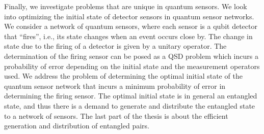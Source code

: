 Finally, we investigate problems that are unique in quantum sensors. We look into optimizing the initial state of detector sensors 
in quantum sensor networks. We consider a network of quantum sensors, where each sensor is a qubit detector that “fires”, 
i.e., its state changes when an event occurs close by. The change in state due to the firing of a detector is given 
by a unitary operator. The determination of the firing sensor can be posed as a QSD problem which incurs a probability 
of error depending on the initial state and the measurement operators used. We address the problem of determining 
the optimal initial state of the quantum sensor network that incurs a minimum probability of error in determining the firing sensor.
The optimal initial state is in general an entangled state, and thus there is a demand to generate and distribute the 
entangled state to a network of sensors. The last part of the thesis is about the efficient generation and distribution of entangled pairs.
